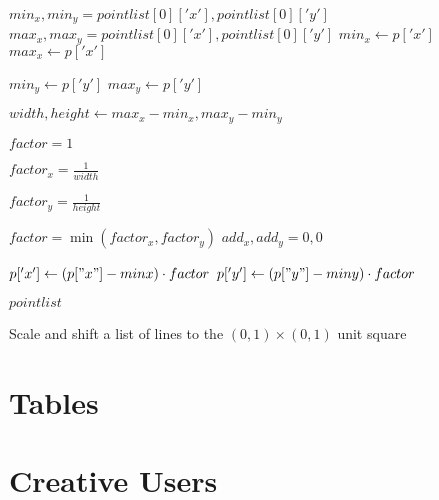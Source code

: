 \begin{algorithm}[ht]
    \begin{algorithmic}
            \State $min_x, min_y = pointlist[0]['x'], pointlist[0]['y']$
            \State $max_x, max_y = pointlist[0]['x'], pointlist[0]['y']$
                        \State $min_x \gets p['x']$
                        \State $max_x \gets p['x']$
                    \EndIf

                        \State $min_y \gets p['y']$
                        \State $max_y \gets p['y']$
                    \EndIf
                \EndFor
            \EndFor

            \State $width, height \gets max_x - min_x, max_y - min_y$

            \State $factor = 1$

                \State $factor_x = \frac{1}{width}$
            \EndIf

                \State $factor_y = \frac{1}{height}$
            \EndIf

            \State $factor = \min(factor_x, factor_y)$
            \State $add_x, add_y = 0, 0$

                    \State $p['x'] \gets (p["x"] - minx) \cdot factor$
                    \State $p['y'] \gets (p["y"] - miny) \cdot factor$
                \EndFor
            \EndFor

            \Return $pointlist$
        \EndFunction
    \end{algorithmic}
\caption{Scale and shift a list of lines to the $(0,1) \times (0, 1)$ unit square}
\label{alg:scale-and-shift}
\end{algorithm}
\clearpage

\section{Tables}\label{appendix:tables}


\section{Creative Users}\label{appendix:creative-users}



